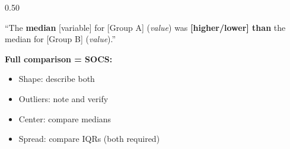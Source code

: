 \documentclass[aspectratio=169, 11pt]{beamer}
\begin{document}
{\begin{frame}[t, plain]
\begin{minipage}{0.9\textwidth}
\begin{columns}[T]
\begin{column}{0.50\textwidth}
      \vspace{0.4em}
      \begin{block}{}
      \small
      ``The \textbf{median} [variable] for [Group A]
      (\textit{value}) was \textbf{[higher/lower] than}
      the median for [Group B] (\textit{value}).''
      \end{block}

      \vspace{0.5em}
      \textbf{Full comparison = SOCS:}
      \begin{itemize}\setlength{\itemsep}{0.3em}
        \item Shape: describe both
        \item Outliers: note and verify
        \item Center: compare medians
        \item Spread: compare IQRs (both required)
      \end{itemize}
    \end{column}
    \end{columns}
  \end{minipage}
\end{frame}
}
\end{document}
